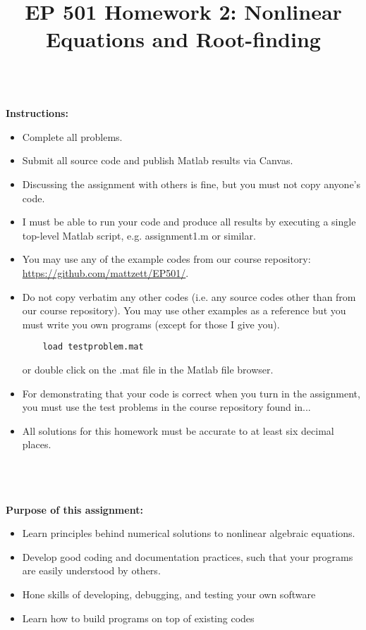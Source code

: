 \documentclass{article}
\begin{document}
\title{EP 501 Homework 2:  Nonlinear Equations and Root-finding}

\maketitle

~\\
\textbf{Instructions:}  
\begin{itemize}
  \item Complete all problems.
  \item Submit all source code and publish Matlab results via Canvas.  
  \item Discussing the assignment with others is fine, but you must not copy anyone's code.  
  \item I must be able to run your code and produce all results by executing a single top-level Matlab script, e.g. \textsf{assignment1.m} or similar.  
  \item You may use any of the example codes from our course repository:  \url{https://github.com/mattzett/EP501/}.
  \item Do not copy verbatim any other codes (i.e. any source codes other than from our course repository).  You may use other examples as a reference but you must write you own programs (except for those I give you).  
    \begin{verbatim}
    load testproblem.mat
    \end{verbatim}
    or double click on the .mat file in the Matlab file browser.  
    \item For demonstrating that your code is correct when you turn in the assignment, you must use the test problems in the course repository found in...
    \item  All solutions for this homework must be accurate to at least six decimal places.  

\end{itemize}
~\\~\\~\\
\textbf{Purpose of this assignment:}  
\begin{itemize}
  \item Learn principles behind numerical solutions to nonlinear algebraic equations.  
  \item Develop good coding and documentation practices, such that your programs are easily understood by others.  
  \item Hone skills of developing, debugging, and testing your own software
  \item Learn how to build programs on top of existing codes
\end{itemize}
\end{document}
